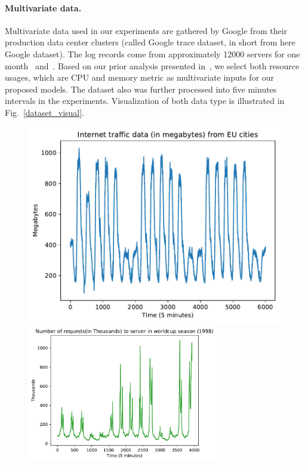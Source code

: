 \documentclass[11pt,twoside]{article}
\begin{document}
\begin{multicols}{2}
\paragraph{\textbf{Multivariate data.}} Multivariate data used in our experiments are gathered by Google from their production data center clusters (called Google trace dataset, in short from here Google dataset). The log records come from approximately 12000 servers for one month~\citep{ref_google_trace} and~\citep{reiss2011google}. Based on our prior analysis presented in~\citep{ref_thieu}, we select both resource usages, which are CPU and memory metric as multivariate inputs for our proposed models. The dataset also was further processed into five minutes intervals in the experiments. Visualization of both data type is illustrated in Fig.~\ref{dataset_visual}.

\begin{figure}[!ht] 
  \begin{minipage}[b]{0.48\linewidth}
    \centering
    \includegraphics[width=0.9\linewidth]{data/internet_traffic_eu_5m.pdf} 
  \end{minipage}
  \begin{minipage}[b]{0.48\linewidth}
    \centering
    \includegraphics[width=0.9\linewidth, height=6cm]{data/worldcup98_5m.pdf} 
  \end{minipage} 
  

\end{figure}
\end{multicols}
\end{document}
